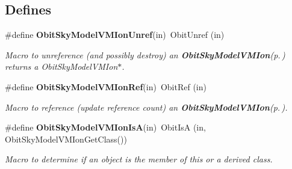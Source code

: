 \subsection*{Defines}
\begin{CompactItemize}
\item 
\#define {\bf Obit\-Sky\-Model\-VMIon\-Unref}(in)\ Obit\-Unref (in)
\begin{CompactList}\small\item\em Macro to unreference (and possibly destroy) an {\bf Obit\-Sky\-Model\-VMIon}{\rm (p.\,\pageref{structObitSkyModelVMIon})} returns a Obit\-Sky\-Model\-VMIon$\ast$. \item\end{CompactList}\item 
\#define {\bf Obit\-Sky\-Model\-VMIon\-Ref}(in)\ Obit\-Ref (in)
\begin{CompactList}\small\item\em Macro to reference (update reference count) an {\bf Obit\-Sky\-Model\-VMIon}{\rm (p.\,\pageref{structObitSkyModelVMIon})}. \item\end{CompactList}\item 
\#define {\bf Obit\-Sky\-Model\-VMIon\-Is\-A}(in)\ Obit\-Is\-A (in, Obit\-Sky\-Model\-VMIon\-Get\-Class())
\begin{CompactList}\small\item\em Macro to determine if an object is the member of this or a derived class. \item\end{CompactList}\end{CompactItemize}
